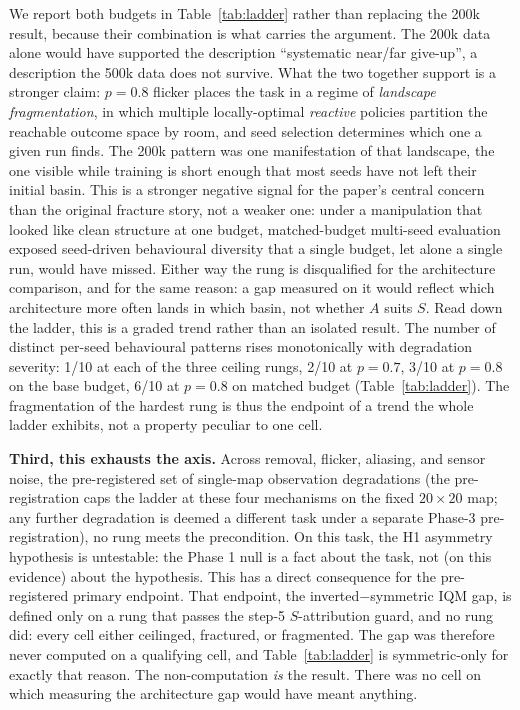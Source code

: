 \documentclass[10pt]{article}
\begin{document}
We report both budgets in Table~\ref{tab:ladder} rather than replacing the 200k result,
because their combination is what carries the argument. The 200k data alone would have
supported the description ``systematic near/far give-up'', a description the 500k data does
not survive. What the two together support is a stronger claim: $p=0.8$ flicker places the
task in a regime of \emph{landscape fragmentation}, in which multiple locally-optimal
\emph{reactive} policies partition the reachable outcome space by room, and seed selection
determines which one a given run finds. The 200k pattern was one manifestation of that
landscape, the one visible while training is short enough that most seeds have not left
their initial basin. This is a stronger negative signal for the paper's central concern than
the original fracture story, not a weaker one: under a manipulation that looked like clean
structure at one budget, matched-budget multi-seed evaluation exposed seed-driven
behavioural diversity that a single budget, let alone a single run, would have missed. Either
way the rung is disqualified for the architecture comparison, and for the same reason: a gap
measured on it would reflect which architecture more often lands in which basin, not whether
$A$ suits $S$. Read down the ladder, this is a graded trend rather than an isolated result.
The number of distinct per-seed behavioural patterns rises monotonically with degradation
severity: 1/10 at each of the three ceiling rungs, 2/10 at $p=0.7$, 3/10 at $p=0.8$ on the
base budget, 6/10 at $p=0.8$ on matched budget (Table~\ref{tab:ladder}). The fragmentation
of the hardest rung is thus the endpoint of a trend the whole ladder exhibits, not a
property peculiar to one cell.

\textbf{Third, this exhausts the axis.} Across removal, flicker, aliasing, and sensor noise,
the pre-registered set of single-map observation degradations (the pre-registration caps the
ladder at these four mechanisms on the fixed $20\times20$ map; any further degradation is
deemed a different task under a separate Phase-3 pre-registration), no rung meets the
precondition. On this task, the H1 asymmetry hypothesis is untestable: the Phase 1
null is a fact about the task, not (on this evidence) about the hypothesis. This has a direct
consequence for the pre-registered primary endpoint. That endpoint, the
inverted$-$symmetric IQM gap, is defined only on a rung that passes the step-5
$S$-attribution guard, and no rung did: every cell either ceilinged, fractured, or
fragmented. The gap was therefore never computed on a qualifying cell, and
Table~\ref{tab:ladder} is symmetric-only for exactly that reason. The non-computation
\emph{is} the result. There was no cell on which measuring the architecture gap would have
meant anything.
\end{document}
